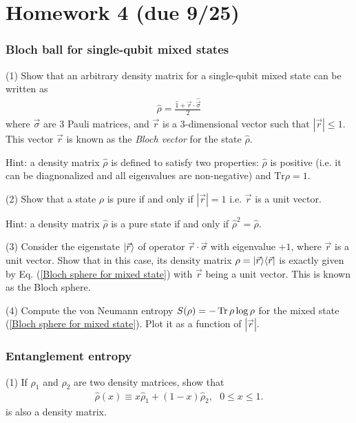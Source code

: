 \chapter{Homework 4 (due 9/25)}

\subsection{Bloch ball for single-qubit mixed states}

(1) Show that an arbitrary density matrix for a single-qubit mixed state can be written as
\begin{align}\label{Bloch sphere for mixed state}
\hat \rho=\frac{\hat 1+\vec r\cdot\hat{\vec\sigma}}2
\end{align}
where $\vec\sigma$ are 3 Pauli matrices, and $\vec r$ is a 3-dimensional vector such that $|\vec r|\leq1$. This vector $\vec r$ is known as the \emph{Bloch vector} for the state $\hat\rho$. 

Hint: a density matrix $\hat \rho$ is defined to satisfy two properties: $\hat \rho$ is positive (i.e. it can be diagnonalized and all eigenvalues are non-negative) and $\text{Tr}\rho=1$. 

(2) Show that a state $\rho$ is pure if and only if $|\vec r|=1$ i.e. $\vec r$ is a unit vector. 

Hint: a density matrix $\hat\rho$ is a pure state if and only if $\hat\rho^2=\hat\rho$.

(3) Consider the eigenstate $|{\vec r}\rangle$ of operator $\vec r\cdot\vec\sigma$ with eigenvalue $+1$, where $\vec r$ is a unit vector. Show that in this case, its density matrix $\rho=|{\vec r}\rangle\langle{\vec r}|$ is exactly given by Eq. (\ref{Bloch sphere for mixed state}) with $\vec r$ being a unit vector. This is known as the Bloch sphere. 

(4) Compute the von Neumann entropy $S(\rho)=-\operatorname{Tr}\rho\log\rho$ for the mixed state (\ref{Bloch sphere for mixed state}). Plot it as a function of $|\vec r|$. 


\subsection{Entanglement entropy}

(1) If $\rho_1$ and $\rho_2$ are two density matrices, show that
\begin{align}\label{convex set:density matrix}
\hat\rho(x)\equiv x\hat\rho_1+(1-x)\hat\rho_2,~~~0\leq x\leq1.
\end{align}
is also a density matrix. 

